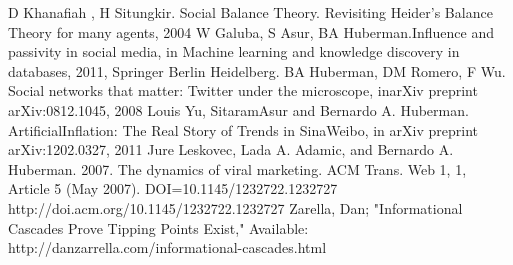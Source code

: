 \documentclass[conference,letterpaper]{IEEEtran}
\begin{document}
\begin{thebibliography}{1}
D Khanafiah , H Situngkir. Social Balance Theory. Revisiting Heider’s Balance Theory for many agents, 2004
W Galuba, S Asur, BA Huberman.Influence and passivity in social media, in Machine learning and knowledge discovery in databases, 2011, Springer Berlin Heidelberg.
BA Huberman, DM Romero, F Wu. Social networks that matter: Twitter under the microscope, inarXiv preprint arXiv:0812.1045, 2008
Louis Yu, SitaramAsur and Bernardo A. Huberman. ArtificialInflation: The Real Story of Trends in SinaWeibo, in arXiv preprint arXiv:1202.0327, 2011
Jure Leskovec, Lada A. Adamic, and Bernardo A. Huberman. 2007. The dynamics of viral marketing. ACM Trans. Web 1, 1, Article 5 (May 2007). DOI=10.1145/1232722.1232727 http://doi.acm.org/10.1145/1232722.1232727
Zarella, Dan; "Informational Cascades Prove Tipping Points Exist," Available: http://danzarrella.com/informational-cascades.html
\end{thebibliography}
\end{document}
